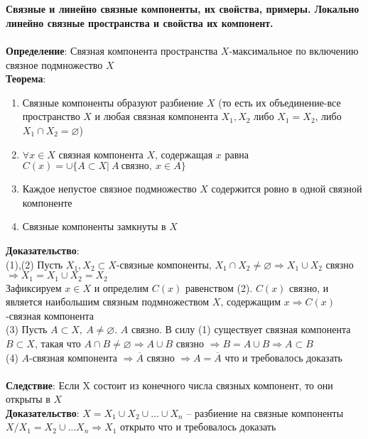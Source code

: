 \newpage
\section{}
	\textbf{Связные и линейно связные компоненты, их свойства, примеры. Локально линейно связные пространства и свойства их компонент.}\\
	\\
	\textbf{Определение}: Связная компонента пространства $X$-максимальное по включению связное подмножество $X$\\
	\textbf{Теорема}: 
	\begin{enumerate}
		\item 
		Связные компоненты образуют разбиение $X$ (то есть их объединение-все пространство $X$ и любая связная компонента $X_1,X_2$ либо $X_1 = X_2$, либо $X_1 \cap X_2 = \varnothing$)
		\item 
		$\forall x\in X$ связная компонента $X$, содержащая $x$ равна $C(x)=\cup \{A\subset X |\ A\ \text{связно},\ x\in A\}$
		\item 
		Каждое непустое связное подмножество $X$ содержится ровно в одной связной компоненте 
		\item 
		Связные компоненты замкнуты в $X$
	\end{enumerate}
	\textbf{Доказательство}:\\
	(1),(2) Пусть $X_1, X_2 \subset X$-связные компоненты, $X_1 \cap X_2 \neq \varnothing \Rightarrow X_1 \cup X_2$ связно $\Rightarrow X_1=X_1 \cup X_2=X_2$\\
	Зафиксируем $x\in X$ и определим $C(x)$ равенством (2). $C(x)$ связно, и является наибольшим связным подмножеством $X$, содержащим $x \Rightarrow C(x)$-связная компонента\\
	(3) Пусть $A\subset X,\ A \neq \varnothing$. $A$ связно. В силу (1) существует связная компонента $B\subset X$, такая что $A\cap B \neq \varnothing \Rightarrow A\cup B$ связно $\Rightarrow B=A\cup B \Rightarrow A\subset B$\\
	(4) $A$-связная компонента $\Rightarrow \overline{A}$ связно $\Rightarrow A = \overline{A}$ что и требовалось доказать\\
	\\
	\textbf{Следствие}: Если X состоит из конечного числа связных компонент, то они открыты в $X$\\
	\textbf{Доказательство}: $X=X_1 \cup X_2 \cup \ldots \cup X_n$ -- разбиение на связные компоненты $X\slash X_1=X_2 \cup \ldots X_n \Rightarrow X_1$ открыто что и требовалось доказать\\
